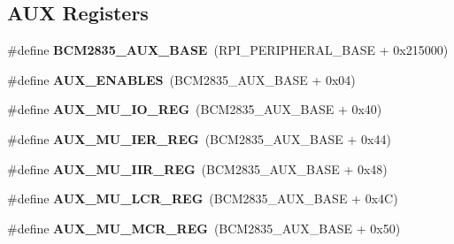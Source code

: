 \subsection*{A\+UX Registers}
\begin{DoxyCompactItemize}
\item 
\mbox{\label{group__raspberrypi__reg_gad97096f71b9d87e0c4b63f22124b5bb6}} 
\#define {\bfseries B\+C\+M2835\+\_\+\+A\+U\+X\+\_\+\+B\+A\+SE}~(R\+P\+I\+\_\+\+P\+E\+R\+I\+P\+H\+E\+R\+A\+L\+\_\+\+B\+A\+SE + 0x215000)
\item 
\mbox{\label{group__raspberrypi__reg_ga9c0d99d551f0013cada5ad4aac5f1e0b}} 
\#define {\bfseries A\+U\+X\+\_\+\+E\+N\+A\+B\+L\+ES}~(B\+C\+M2835\+\_\+\+A\+U\+X\+\_\+\+B\+A\+SE + 0x04)
\item 
\mbox{\label{group__raspberrypi__reg_ga90bc89458f19c7cf9c5ef60765f9c47d}} 
\#define {\bfseries A\+U\+X\+\_\+\+M\+U\+\_\+\+I\+O\+\_\+\+R\+EG}~(B\+C\+M2835\+\_\+\+A\+U\+X\+\_\+\+B\+A\+SE + 0x40)
\item 
\mbox{\label{group__raspberrypi__reg_gacfe85b09f1a9af015443e4ac7ee63931}} 
\#define {\bfseries A\+U\+X\+\_\+\+M\+U\+\_\+\+I\+E\+R\+\_\+\+R\+EG}~(B\+C\+M2835\+\_\+\+A\+U\+X\+\_\+\+B\+A\+SE + 0x44)
\item 
\mbox{\label{group__raspberrypi__reg_ga8e5ebc2656b6960e85c002a05c2f7d8e}} 
\#define {\bfseries A\+U\+X\+\_\+\+M\+U\+\_\+\+I\+I\+R\+\_\+\+R\+EG}~(B\+C\+M2835\+\_\+\+A\+U\+X\+\_\+\+B\+A\+SE + 0x48)
\item 
\mbox{\label{group__raspberrypi__reg_ga98016f093381e824a53879e9210eda1b}} 
\#define {\bfseries A\+U\+X\+\_\+\+M\+U\+\_\+\+L\+C\+R\+\_\+\+R\+EG}~(B\+C\+M2835\+\_\+\+A\+U\+X\+\_\+\+B\+A\+SE + 0x4\+C)
\item 
\mbox{\label{group__raspberrypi__reg_ga6193062e2471db033e6ace80537d81cb}} 
\#define {\bfseries A\+U\+X\+\_\+\+M\+U\+\_\+\+M\+C\+R\+\_\+\+R\+EG}~(B\+C\+M2835\+\_\+\+A\+U\+X\+\_\+\+B\+A\+SE + 0x50)
\item 
\mbox{\label{group__raspberrypi__reg_ga277c8db0ce14fd1fce1431c56c50d11b}} 

\end{DoxyCompactItemize}
